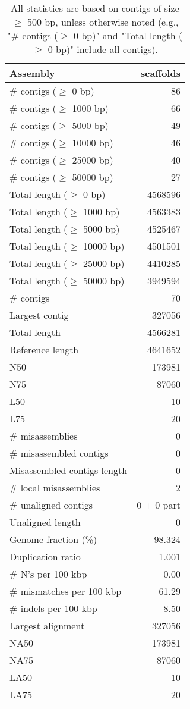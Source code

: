 \documentclass[12pt,a4paper]{article}
\begin{document}
\begin{table}[ht]
\begin{center}
\caption{All statistics are based on contigs of size $\geq$ 500 bp, unless otherwise noted (e.g., "\# contigs ($\geq$ 0 bp)" and "Total length ($\geq$ 0 bp)" include all contigs).}
\begin{tabular}{|l*{1}{|r}|}
\hline
Assembly & scaffolds \\ \hline
\# contigs ($\geq$ 0 bp) & 86 \\ \hline
\# contigs ($\geq$ 1000 bp) & 66 \\ \hline
\# contigs ($\geq$ 5000 bp) & 49 \\ \hline
\# contigs ($\geq$ 10000 bp) & 46 \\ \hline
\# contigs ($\geq$ 25000 bp) & 40 \\ \hline
\# contigs ($\geq$ 50000 bp) & 27 \\ \hline
Total length ($\geq$ 0 bp) & 4568596 \\ \hline
Total length ($\geq$ 1000 bp) & 4563383 \\ \hline
Total length ($\geq$ 5000 bp) & 4525467 \\ \hline
Total length ($\geq$ 10000 bp) & 4501501 \\ \hline
Total length ($\geq$ 25000 bp) & 4410285 \\ \hline
Total length ($\geq$ 50000 bp) & 3949594 \\ \hline
\# contigs & 70 \\ \hline
Largest contig & 327056 \\ \hline
Total length & 4566281 \\ \hline
Reference length & 4641652 \\ \hline
N50 & 173981 \\ \hline
N75 & 87060 \\ \hline
L50 & 10 \\ \hline
L75 & 20 \\ \hline
\# misassemblies & 0 \\ \hline
\# misassembled contigs & 0 \\ \hline
Misassembled contigs length & 0 \\ \hline
\# local misassemblies & 2 \\ \hline
\# unaligned contigs & 0 + 0 part \\ \hline
Unaligned length & 0 \\ \hline
Genome fraction (\%) & 98.324 \\ \hline
Duplication ratio & 1.001 \\ \hline
\# N's per 100 kbp & 0.00 \\ \hline
\# mismatches per 100 kbp & 61.29 \\ \hline
\# indels per 100 kbp & 8.50 \\ \hline
Largest alignment & 327056 \\ \hline
NA50 & 173981 \\ \hline
NA75 & 87060 \\ \hline
LA50 & 10 \\ \hline
LA75 & 20 \\ \hline
\end{tabular}
\end{center}
\end{table}
\end{document}
